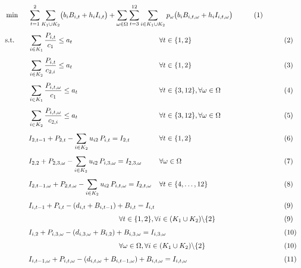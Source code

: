\documentclass[11pt]{article}
\begin{document}
\begin{alignat}{4}
&\min && \sum_{t=1}^{2}\sum_{K_1 \cup K_2}\bigl(b_iB_{i,t}+h_iI_{i,t}\bigr)
+ \sum_{\omega\in\Omega}\sum_{t=3}^{12}\sum_{i \in K_1 \cup K_2}{p_{\omega}}\bigl(b_iB_{i,t,\omega}+h_iI_{i,t,\omega}\bigr)
&& \tag{1} \\[4pt]
&\text{s.t.} \quad
&& \sum_{i \in K_1}\frac{P_{i,t}}{c_1} \leq a_t  && \hspace{-4cm} \forall t\in \{1,2\} &&\tag{2}\\[4pt]
&&& \sum_{i \in K_2}\frac{P_{i,t}}{c_{2,i}}  \leq a_t  &&\hspace{-4cm}  \forall t\in \{1,2\} &&\tag{3}\\[4pt]
&&& \sum_{i \in K_1}\frac{P_{i,t,\omega}}{c_1} \leq a_t  && \hspace{-4cm}\forall t\in \{3,12\},\forall \omega \in \Omega &&\tag{4}\\[4pt]
&&& \sum_{i \in K_2} \frac{P_{i,t,\omega}}{c_{2,i}} \leq a_t  && \hspace{-4cm}\forall t\in \{3,12\},\forall \omega \in \Omega &&\tag{5}\\[4pt]
&&& I_{2,t-1}+P_{2,t}-\sum_{i\in K_2}u_{i2}\,P_{i,t} = I_{2,t} \quad &&\hspace{-4cm} \forall t\in \{1,2\} &&\tag{6}\\[4pt]
&&& I_{2,2}+P_{2,3,\omega}-\sum_{i\in K_2}u_{i2}\,P_{i,3,\omega} = I_{2,3,\omega} \quad && \hspace{-4cm} \forall \omega \in \Omega &&\tag{7}\\[4pt]
&&& I_{2,t-1,\omega}+P_{2,t,\omega}-\sum_{i\in K_2}u_{i2}\,P_{i,t,\omega} = I_{2,t,\omega} \quad && \hspace{-4cm} \forall t\in \{4,\dots,12\} &&\tag{8}\\[4pt]
&&& I_{i,t-1}+P_{i,t} - (d_{i,t}+B_{i,t-1})+B_{i,t} = I_{i,t}
&&  &&\tag{9}\\[4pt]
&&& && \hspace{-6cm} \forall t\in \{1,2\},\forall i\in (K_1 \cup K_2)\backslash \{2\} &&\tag{9}\\[4pt]
&&& I_{i,2}+P_{i,3,\omega} - (d_{i,3,\omega}+B_{i,2})+B_{i,3,\omega} = I_{i,3,\omega}
&&  &&\tag{10}\\[4pt]
&&& && \hspace{-6cm} \forall \omega \in \Omega,\forall i\in (K_1 \cup K_2)\backslash \{2\}&&\tag{10}\\[4pt]
&&& I_{i,t-1,\omega}+P_{i,t,\omega} - (d_{i,t,\omega}+B_{i,t-1,\omega})+B_{i,t,\omega} = I_{i,t,\omega}
&& &&\tag{11}\\[4pt]

\end{alignat}
\end{document}
